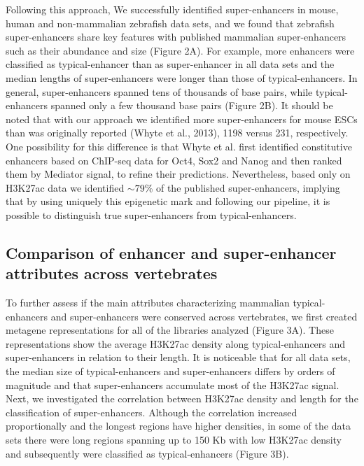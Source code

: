		Following this approach, We successfully identified super-enhancers in mouse, human and non-mammalian zebrafish data sets, and we found that zebrafish super-enhancers share key features with published mammalian super-enhancers such as their abundance and size (Figure 2A). For example, more enhancers were classified as typical-enhancer than as super-enhancer in all data sets and the median lengths of super-enhancers were longer than those of typical-enhancers. In general, super-enhancers spanned tens of thousands of base pairs, while typical-enhancers spanned only a few thousand base pairs (Figure 2B). It should be noted that with our approach we identified more super-enhancers for mouse ESCs than was originally reported (Whyte et al., 2013), 1198 versus 231, respectively. One possibility for this difference is that Whyte et al. first identified constitutive enhancers based on ChIP-seq data for Oct4, Sox2 and Nanog and then ranked them by Mediator signal, to refine their predictions. Nevertheless, based only on H3K27ac data we identified \(\sim79\)\% of the published super-enhancers, implying that by using uniquely this epigenetic mark and following our pipeline, it is possible to distinguish true super-enhancers from typical-enhancers.\\

	\subsection{Comparison of enhancer and super-enhancer attributes across vertebrates}

		To further assess if the main attributes characterizing mammalian typical-enhancers and super-enhancers were conserved across vertebrates, we first created metagene representations for all of the libraries analyzed (Figure 3A). These representations show the average H3K27ac density along typical-enhancers and super-enhancers in relation to their length. It is noticeable that for all data sets, the median size of typical-enhancers and super-enhancers differs by orders of magnitude and that super-enhancers accumulate most of the H3K27ac signal. Next, we investigated the correlation between H3K27ac density and length for the classification of super-enhancers. Although the correlation increased proportionally and the longest regions have higher densities, in some of the data sets there were long regions spanning up to 150 Kb with low H3K27ac density and subsequently were classified as typical-enhancers (Figure 3B).\\

